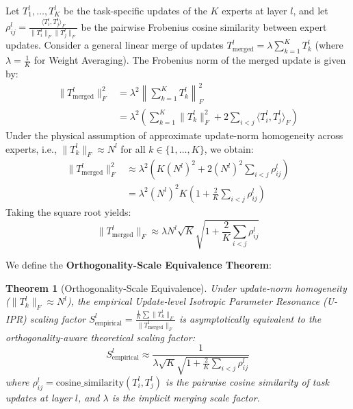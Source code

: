 \documentclass{article}
\newtheorem{theorem}{Theorem}
\begin{document}
Let $T_1^l, \dots, T_K^l$ be the task-specific updates of the $K$ experts at layer $l$, and let $\rho_{ij}^l = \frac{\langle T_i^l, T_j^l \rangle_F}{\|T_i^l\|_F \|T_j^l\|_F}$ be the pairwise Frobenius cosine similarity between expert updates. Consider a general linear merge of updates $T_{\text{merged}}^l = \lambda \sum_{k=1}^K T_k^l$ (where $\lambda = \frac{1}{K}$ for Weight Averaging). The Frobenius norm of the merged update is given by:
\begin{align}
    \|T_{\text{merged}}^l\|_F^2 &= \lambda^2 \left\| \sum_{k=1}^K T_k^l \right\|_F^2 \\
    &= \lambda^2 \left( \sum_{k=1}^K \|T_k^l\|_F^2 + 2 \sum_{i < j} \langle T_i^l, T_j^l \rangle_F \right)
\end{align}
Under the physical assumption of approximate update-norm homogeneity across experts, i.e., $\|T_k^l\|_F \approx N^l$ for all $k \in \{1, \dots, K\}$, we obtain:
\begin{align}
    \|T_{\text{merged}}^l\|_F^2 &\approx \lambda^2 \left( K (N^l)^2 + 2 (N^l)^2 \sum_{i < j} \rho_{ij}^l \right) \\
    &= \lambda^2 (N^l)^2 K \left( 1 + \frac{2}{K} \sum_{i < j} \rho_{ij}^l \right)
\end{align}
Taking the square root yields:
\begin{equation}
    \|T_{\text{merged}}^l\|_F \approx \lambda N^l \sqrt{K} \sqrt{1 + \frac{2}{K} \sum_{i < j} \rho_{ij}^l}
\end{equation}

We define the \textbf{Orthogonality-Scale Equivalence Theorem}:
\begin{theorem}[Orthogonality-Scale Equivalence]
Under update-norm homogeneity ($\|T_k^l\|_F \approx N^l$), the empirical Update-level Isotropic Parameter Resonance (U-IPR) scaling factor $S_{\text{empirical}}^l = \frac{\frac{1}{K}\sum \|T_k^l\|_F}{\|T_{\text{merged}}^l\|_F}$ is asymptotically equivalent to the orthogonality-aware theoretical scaling factor:
\begin{equation}
    S_{\text{empirical}}^l \approx \frac{1}{\lambda \sqrt{K} \sqrt{1 + \frac{2}{K} \sum_{i < j} \rho_{ij}^l}}
\end{equation}
where $\rho_{ij}^l = \text{cosine\_similarity}(T_i^l, T_j^l)$ is the pairwise cosine similarity of task updates at layer $l$, and $\lambda$ is the implicit merging scale factor.
\end{theorem}
\end{document}
